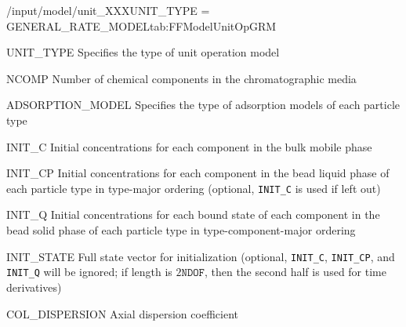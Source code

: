 \begin{condsubgroup}{/input/model/unit\_XXX}{UNIT\_TYPE = GENERAL\_RATE\_MODEL}{tab:FFModelUnitOpGRM}
  \begin{dataset}[type=string,range={\texttt{GENERAL\_RATE\_MODEL}},length=1]{UNIT\_TYPE}
    Specifies the type of unit operation model
  \end{dataset}
  \begin{dataset}[type=int,range={$\geq 1$},length=1]{NCOMP}
    Number of chemical components in the chromatographic media
  \end{dataset}
  \begin{dataset}[type=string,range={See Section~\ref{sec:FFAdsorption}},length={\texttt{NPARTYPE}}]{ADSORPTION\_MODEL}
    Specifies the type of adsorption models of each particle type
  \end{dataset}
  \begin{dataset}[unit=\si{\mol\per\cubic\metre\of{IV}},type=double,range={$\geq 0$},length={\texttt{NCOMP}}]{INIT\_C}
    Initial concentrations for each component in the bulk mobile phase
  \end{dataset}
  \begin{dataset}[unit=\si{\mol\per\cubic\metre\of{MP}},type=double,range={$\geq 0$},length={$\texttt{NPARTYPE} \cdot \texttt{NCOMP}$}]{INIT\_CP}
    Initial concentrations for each component in the bead liquid phase of each particle type in type-major ordering (optional, \texttt{INIT\_C} is used if left out)
  \end{dataset}
  \begin{dataset}[unit=\si{\mol\per\cubic\metre\of{SP}},type=double,range={$\geq 0$},length={\texttt{NTOTALBND}}]{INIT\_Q}
    Initial concentrations for each bound state of each component in the bead solid phase of each particle type in type-component-major ordering
  \end{dataset}
  \begin{dataset}[unit=various,type=double,range={$\mathds{R}$},length={\texttt{NDOF} / $2\texttt{NDOF}$}]{INIT\_STATE}
    Full state vector for initialization (optional, \texttt{INIT\_C}, \texttt{INIT\_CP}, and \texttt{INIT\_Q} will be ignored; if length is $2\texttt{NDOF}$, then the second half is used for time derivatives)
  \end{dataset}
  \begin{dataset}[unit=\si{\square\metre\of{IV}\per\second},type=double,range={$\geq 0$},length={1 / \texttt{NSEC}}]{COL\_DISPERSION}
    Axial dispersion coefficient
  \end{dataset}

\end{condsubgroup}
